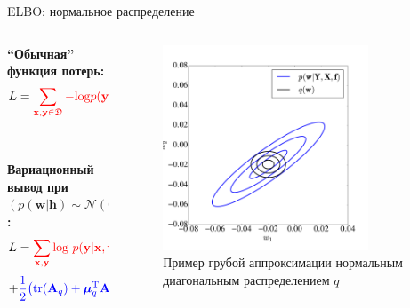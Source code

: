 \documentclass[usenames,dvipsnames,10pt,pdf,utf8,russian,aspectratio=43]{beamer}
\begin{document}
\begin{frame}{ELBO: нормальное распределение}
\begin{columns}[T] 
\begin{column}{.48\textwidth}
\textbf{``Обычная'' функция потерь:}\\
$$
L = \textcolor{red}{\sum_{\mathbf{x}, \mathbf{y} \in \mathfrak{D}} - \text{log}p(\mathbf{y}|\mathbf{x}, \mathbf{w})} + \textcolor{blue}{\lambda||\mathbf{w}||_2^2}.
$$\\~\\

\textbf{Вариационный вывод при $(p(\mathbf{w}|\mathbf{h}) \sim \mathcal{N}(\mathbf{0}, \mathbf{1}))$:}\\
$$
L =   \textcolor{red}{\sum_{\mathbf{x}, \mathbf{y}} \text{log}~p(\mathbf{y}|\mathbf{x}, \hat{\mathbf{w}})} +
$$
$$ + \textcolor{blue}{\frac{1}{2} \bigl( \text{tr} (\mathbf{A}_q) + \boldsymbol{\mu}_q^\text{T}\mathbf{A}^{-1}\boldsymbol{\mu}_q  - \text{ln}~|\mathbf{A}_q| \bigr)}.
$$\\~\\

\end{column}%
\hfill%
\begin{column}{.48\textwidth}

\begin{center}
\begin{figure}
\caption*{Пример грубой аппроксимации нормальным диагональным распределением $q$}
\includegraphics[width=0.8\textwidth]{mf.pdf}
\end{figure}
\end{center}

\end{column}%
\end{columns}

\end{frame}
\end{document}
